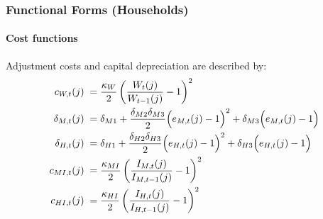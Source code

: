\documentclass[12pt,3p,authoryear,review]{elsarticle}
\begin{document}
\subsubsection{Functional Forms (Households)}%
\begin{small}%
\paragraph{Cost functions}%
Adjustment costs and capital depreciation are described by:%
\begin{align*}%
	c_{W,t}(j) \; = & \; \frac{\kappa_W}{2} \left(\frac{W_t(j)}{W_{t-1}(j)}-1\right)^2\\%
	\delta_{M,t}(j) \; = & \; \delta_{M1} + \frac{\delta_{M2} \delta_{M3}}{2} \Bigl( e_{M,t}(j)-1 \Bigr)^2 + \delta_{M3} \Bigl( e_{M,t}(j)-1 \Bigr)\\%
	\delta_{H,t}(j) \; = & \; \delta_{H1} + \frac{\delta_{H2} \delta_{H3}}{2} \Bigl( e_{H,t}(j)-1 \Bigr)^2 + \delta_{H3} \Bigl( e_{H,t}(j)-1 \Bigr)\\%
	c_{MI,t}(j) \; = & \; \frac{\kappa_{MI}}{2}\left(\frac{I_{M,t}(j)}{I_{M,t-1}(j)}-1\right)^2\\%
	c_{HI,t}(j) \; = & \; \frac{\kappa_{HI}}{2}\left(\frac{I_{H,t}(j)}{I_{H,t-1}(j)}-1\right)^2%
\end{align*}%

\end{small}
\end{document}
